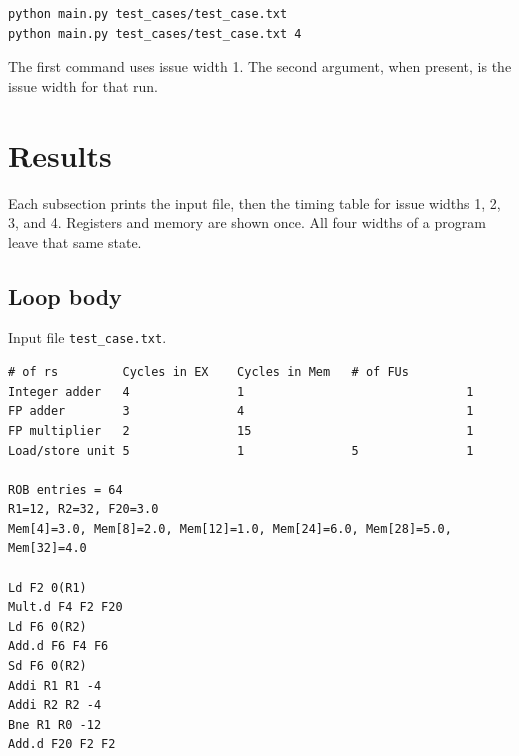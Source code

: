 \documentclass[11pt]{article}
\begin{document}
\begin{Verbatim}[fontsize=\small]
python main.py test_cases/test_case.txt
python main.py test_cases/test_case.txt 4
\end{Verbatim}

The first command uses issue width 1. The second argument, when present, is the issue width for that run.

\clearpage
\section{Results}

Each subsection prints the input file, then the timing table for issue widths 1, 2, 3, and 4. Registers and memory are shown once. All four widths of a program leave that same state.
\subsection{Loop body}
Input file \texttt{test\_case.txt}.
\begin{Verbatim}[fontsize=\footnotesize]
               # of rs         Cycles in EX    Cycles in Mem   # of FUs
Integer adder   4               1                               1
FP adder        3               4                               1
FP multiplier   2               15                              1
Load/store unit 5               1               5               1

ROB entries = 64
R1=12, R2=32, F20=3.0
Mem[4]=3.0, Mem[8]=2.0, Mem[12]=1.0, Mem[24]=6.0, Mem[28]=5.0, Mem[32]=4.0

Ld F2 0(R1)
Mult.d F4 F2 F20
Ld F6 0(R2)
Add.d F6 F4 F6
Sd F6 0(R2)
Addi R1 R1 -4
Addi R2 R2 -4
Bne R1 R0 -12
Add.d F20 F2 F2
\end{Verbatim}
\end{document}
